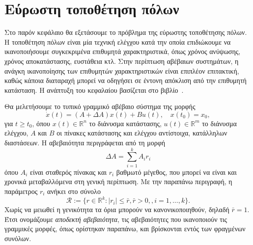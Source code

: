 \chapter{Εύρωστη τοποθέτηση πόλων}\label{ch:pp}
Στο παρόν κεφάλαιο θα εξετάσουμε το πρόβλημα της εύρωστης τοποθέτησης πόλων. Η
τοποθέτηση πόλων είναι μία τεχνική ελέγχου κατά την οποία επιδιώκουμε να
ικανοποιήσουμε συγκεκριμένα επιθυμητά χαρακτηριστικά, όπως χρόνος ανύψωσης,
χρόνος αποκατάστασης, ευστάθεια κτλ. Στην περίπτωση αβέβαιων συστημάτων, η
ανάγκη ικανοποίησης των επιθυμητών χαρακτηριστικών είναι επιπλέον επιτακτική,
καθώς κάποια διαταραχή μπορεί να οδηγήσει σε έντονη απόκλιση από την επιθυμητή
κατάσταση. Η ανάπτυξη του κεφαλαίου βασίζεται στο βιβλίο~\cite{kosmidou2009robust}.

Θα μελετήσουμε το τυπικό γραμμικό αβέβαιο σύστημα της μορφής
\begin{equation}\label{eq:pp_un_ss}
    \dot{x}(t) = (A + \Delta A)x(t) + Bu(t), \quad x(t_0) = x_0,
\end{equation}
για \( t \geq t_0 \), όπου \( x(t) \in \mathbb{R}^n \) το διάνυσμα κατάστασης,
\( u(t) \in \mathbb{R}^m \) το διάνυσμα ελέγχου, \( A \) και \( B \) οι πίνακες
κατάστασης και ελέγχου αντίστοιχα, κατάλληλων διαστάσεων. Η αβεβαιότητα
περιγράφεται από τη μορφή
\[
    \Delta A = \sum_{i = 1}^{k} A_i r_i
\]
όπου \( A_i \) είναι σταθερός πίνακας και \( r_i \) βαθμωτό
μέγεθος, που μπορεί να είναι και χρονικά μεταβαλλόμενα στη γενική περίπτωση. Με
την παραπάνω περιγραφή, η παράμετρος \( r_i \) ανήκει στο σύνολο
\[
    \mathcal{R} := \{ r \in \mathbb{R}^k: |r_i| \leq \bar{r}, \bar{r} > 0, ,i = 1, \dots,
    k \}.
\]
Χωρίς να μειωθεί η γενικότητα τα όρια μπορούν να κανονικοποιηθούν, δηλαδή \(
\bar{r} =  1 \). Έτσι ονομάζουμε \emph{αποδεκτή αβεβαιότητα}, τις
αβεβαιότητες που ικανοποιούν τις γραμμικές μορφές, όπως ορίστηκαν παραπάνω, και
βρίσκονται εντός των φραγμένων συνόλων.

